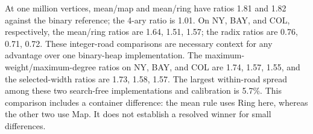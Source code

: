 At one million vertices, mean/map and mean/ring have ratios 1.81 and 1.82 against the binary reference; the 4-ary ratio is 1.01. On NY, BAY, and COL, respectively, the mean/ring ratios are 1.64, 1.51, 1.57; the radix ratios are 0.76, 0.71, 0.72. These integer-road comparisons are necessary context for any advantage over one binary-heap implementation.
The maximum-weight/maximum-degree ratios on NY, BAY, and COL are 1.74, 1.57, 1.55, and the selected-width ratios are 1.73, 1.58, 1.57. The largest within-road spread among these two search-free implementations and calibration is 5.7\%. This comparison includes a container difference: the mean rule uses Ring here, whereas the other two use Map. It does not establish a resolved winner for small differences.
